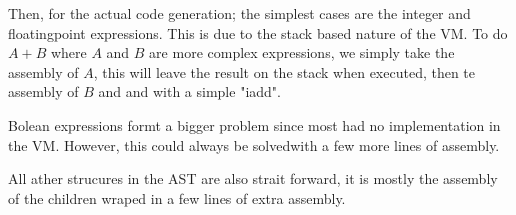 \documentclass[a4paper,11pt]{report}
\begin{document}
Then, for the actual code generation; the simplest cases are the integer and floatingpoint expressions.
This is due to the stack based nature of the VM. To do $A+B$ where $A$ and $B$ are more complex expressions, we simply take the assembly of $A$, this will leave the result on the stack when executed, then te assembly of $B$ and and with a simple "iadd".

Bolean expressions formt a bigger problem since most had no implementation in the VM. However, this could always be solvedwith a few more lines of assembly.

All ather strucures in the AST are also strait forward, it is mostly the assembly of the children wraped in a few lines of extra assembly.
\end{document}
